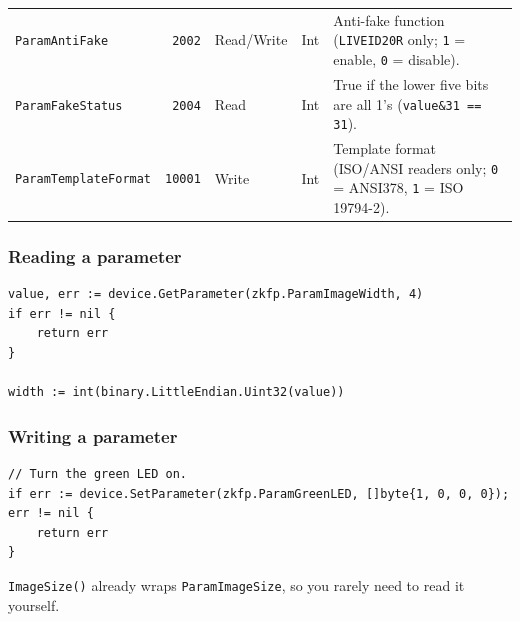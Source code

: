 \documentclass[11pt, a4paper]{article}
\begin{document}
\begin{table}[htbp]
\begin{tabularx}{\textwidth}{l r l l X}
\texttt{ParamAntiFake} & \texttt{2002} & Read/Write & Int & Anti-fake function (\texttt{LIVEID20R} only; \texttt{1} = enable, \texttt{0} = disable). \\
\texttt{ParamFakeStatus} & \texttt{2004} & Read & Int & True if the lower five bits are all 1's (\texttt{value\&31 == 31}). \\
\texttt{ParamTemplateFormat} & \texttt{10001} & Write & Int & Template format (ISO/ANSI readers only; \texttt{0} = ANSI378, \texttt{1} = ISO 19794-2). \\
\bottomrule
\end{tabularx}
\end{table}

\subsubsection*{Reading a parameter}
\begin{lstlisting}
value, err := device.GetParameter(zkfp.ParamImageWidth, 4)
if err != nil {
    return err
}

width := int(binary.LittleEndian.Uint32(value))
\end{lstlisting}

\subsubsection*{Writing a parameter}
\begin{lstlisting}
// Turn the green LED on.
if err := device.SetParameter(zkfp.ParamGreenLED, []byte{1, 0, 0, 0}); err != nil {
    return err
}
\end{lstlisting}

\texttt{ImageSize()} already wraps \texttt{ParamImageSize}, so you rarely need to read it yourself.
\end{document}
